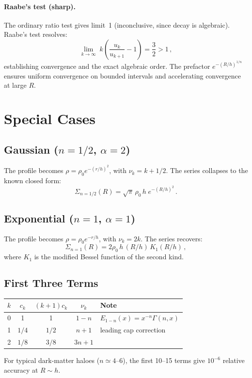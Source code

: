\documentclass{article}
\begin{document}
\paragraph{Raabe's test (sharp).}
The ordinary ratio test gives limit~1 (inconclusive, since decay is algebraic).
Raabe's test resolves:
\begin{equation}
\lim_{k\to\infty}\; k\left(\frac{u_k}{u_{k+1}}-1\right) = \frac{3}{2} > 1\,,
\end{equation}
establishing convergence and the exact algebraic order.  The prefactor
$e^{-(R/h)^{1/n}}$ ensures uniform convergence on bounded intervals and
accelerating convergence at large $R$.

\section{Special Cases}
\label{sec:special}

\subsection{Gaussian ($n=1/2$, $\alpha=2$)}

The profile becomes $\rho=\rho_0 e^{-(r/h)^2}$, with
$\nu_k = k+1/2$.  The series collapses to the known closed form:
\begin{equation}
\Sigma_{n=1/2}(R) = \sqrt\pi\,\rho_0\,h\;e^{-(R/h)^2}\,.
\end{equation}

\subsection{Exponential ($n=1$, $\alpha=1$)}

The profile becomes $\rho=\rho_0 e^{-r/h}$, with $\nu_k = 2k$.
The series recovers:
\begin{equation}
\Sigma_{n=1}(R) = 2\rho_0\,h\,(R/h)\,K_1(R/h)\,,
\end{equation}
where $K_1$ is the modified Bessel function of the second kind.

\subsection{First Three Terms}

\begin{center}
\begin{tabular}{ccccl}
\toprule
$k$ & $c_k$ & $(k+1)c_k$ & $\nu_k$ & Note \\
\midrule
0 & 1     & 1     & $1-n$  & $E_{1-n}(x)=x^{-n}\Gamma(n,x)$ \\
1 & $1/4$ & $1/2$ & $n+1$  & leading cap correction \\
2 & $1/8$ & $3/8$ & $3n+1$ & \\
\bottomrule
\end{tabular}
\end{center}
For typical dark-matter haloes ($n\simeq4$--$6$), the first 10--15 terms give
$10^{-6}$ relative accuracy at $R\sim h$.
\end{document}
